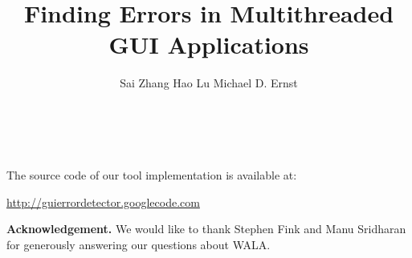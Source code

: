 \documentclass{sig-alternate}
\begin{document}
\title{Finding Errors in Multithreaded GUI Applications}


\author{
\alignauthor Sai Zhang \quad Hao Lu \quad Michael D. Ernst\\
       \\
       \\
}


\maketitle
















The source code of our tool implementation is available at:

\vspace{1mm}

\noindent \url{http://guierrordetector.googlecode.com}


\vspace{2mm}

\noindent \textbf{Acknowledgement.} We would like
to thank Stephen Fink and Manu Sridharan for
generously answering our questions about WALA.
\vspace{-2mm}


\footnotesize{

}
\end{document}
